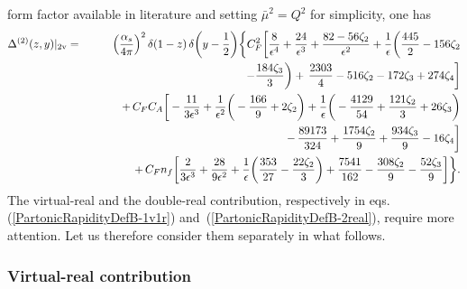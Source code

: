 \documentclass[11pt]{article}
\newcommand{\bea}{\begin{eqnarray}}
\newcommand{\eea}{\end{eqnarray}}
\newcommand{\nn}{\nonumber}
\newcommand{\eps}{\epsilon}
\newcommand\eqns[2]    {eqs.\,(\ref{#1}) and~(\ref{#2})}
\begin{document}
form factor available in literature \cite{Matsuura:1987wt,Gehrmann:2010ue} 
and setting $\bar{\mu}^2 = Q^2$
for simplicity, one has
\bea\label{PartonicRapidityRes-2virtual} \nn
\Delta^{(2)}(z,y)|_{\rm 2v} &=& 
\left(\frac{\alpha_s}{4\pi}\right)^2\delta(1-z) \, \delta\bigg(y - \frac{1}{2} \bigg)
\bigg\{C_F^2 \bigg[\frac{8}{\eps^4}+\frac{24}{\eps^3} 
+\frac{82 - 56 \zeta_2}{\eps^2} +\frac{1}{\eps} 
\bigg(\frac{445}{2} - 156 \zeta_2 \\ \nn
&&\hspace{2.0cm} - \frac{184 \zeta_3}{3}\bigg) 
+\,\frac{2303}{4} - 516 \zeta_2
- 172 \zeta_3 + 274 \zeta_4 \bigg] \\ \nn
&&\hspace{1.0cm}+\, C_F C_A \bigg[ -\frac{11}{3 \eps^3} 
 + \frac{1}{\eps^2}\bigg(-\frac{166}{9} + 2 \zeta_2\bigg) 
+ \frac{1}{\eps}\bigg(-\frac{4129}{54}
+ \frac{121 \zeta_2}{3} + 26 \zeta_3\bigg) \\ 
&&\hspace{2.0cm}-\,\frac{89173}{324}+ \frac{1754 \zeta_2}{9}
+ \frac{934 \zeta_3}{9} - 16 \zeta_4 \bigg] \nn \\ 
&&\hspace{0.01cm}+\, C_F n_f 
\bigg[ \frac{2}{3 \eps^3} + \frac{28}{9 \eps^2} 
+ \frac{1}{\eps}\bigg( \frac{353}{27} 
- \frac{22 \zeta_2}{3} \bigg) 
+ \frac{7541}{162} - \frac{308 \zeta_2}{9} 
- \frac{52 \zeta_3}{9} \bigg]\bigg\}.
\eea
The virtual-real and the double-real 
contribution, respectively in 
\eqns{PartonicRapidityDefB-1v1r}{PartonicRapidityDefB-2real},
require more attention. Let us therefore 
consider them separately in what follows.

\subsubsection*{Virtual-real contribution}
\end{document}
